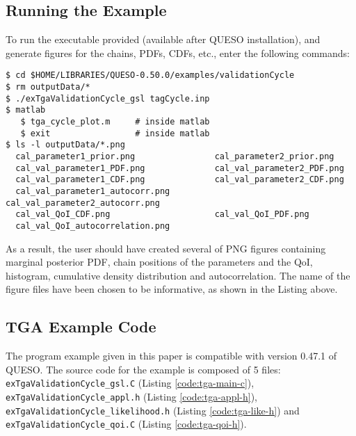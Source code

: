 \subsection{Running the Example}\label{sec:tga-run}

To run the executable provided (available after QUESO installation), and generate figures for the chains, PDFs, CDFs, etc., enter the following commands:
\begin{lstlisting}[label={},caption={}]
$ cd $HOME/LIBRARIES/QUESO-0.50.0/examples/validationCycle
$ rm outputData/*
$ ./exTgaValidationCycle_gsl tagCycle.inp    
$ matlab
   $ tga_cycle_plot.m     # inside matlab
   $ exit                 # inside matlab
$ ls -l outputData/*.png
  cal_parameter1_prior.png                cal_parameter2_prior.png                
  cal_val_parameter1_PDF.png              cal_val_parameter2_PDF.png              
  cal_val_parameter1_CDF.png              cal_val_parameter2_CDF.png              
  cal_val_parameter1_autocorr.png         cal_val_parameter2_autocorr.png
  cal_val_QoI_CDF.png                     cal_val_QoI_PDF.png
  cal_val_QoI_autocorrelation.png            
\end{lstlisting}


As a result, the user should have created several of PNG figures containing marginal posterior PDF, chain positions of the parameters and the QoI, histogram, cumulative density distribution and autocorrelation. The name of the figure files have been chosen to be informative, as shown in the Listing above.



\subsection{TGA Example Code}\label{sec:code-tga}



The program example given in this paper is compatible with version 0.47.1 of QUESO.
The source code for the example is composed of 5 files:
 \texttt{exTgaValidationCycle\_gsl.C} (Listing \ref{code:tga-main-c}),
 \texttt{exTgaValidationCycle\_appl.h} (Listing \ref{code:tga-appl-h}), 
 \texttt{exTgaValidationCycle\_likelihood.h}  (Listing \ref{code:tga-like-h}) and 
\texttt{exTgaValidationCycle\_qoi.C} (Listing \ref{code:tga-qoi-h}).






